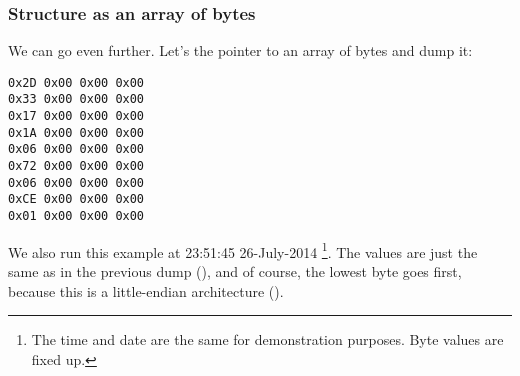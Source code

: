 \subsubsection{Structure as an array of bytes}

We can go even further. Let's  the pointer to an array of bytes and dump it:



\begin{lstlisting}
0x2D 0x00 0x00 0x00 
0x33 0x00 0x00 0x00 
0x17 0x00 0x00 0x00 
0x1A 0x00 0x00 0x00 
0x06 0x00 0x00 0x00 
0x72 0x00 0x00 0x00 
0x06 0x00 0x00 0x00 
0xCE 0x00 0x00 0x00 
0x01 0x00 0x00 0x00 
\end{lstlisting}

We also run this example at 23:51:45 26-July-2014
\footnote{The time and date are the same for demonstration purposes. Byte values are fixed up.}.
The values are just the same as in the previous dump 
(), and of course, the lowest byte goes first, because this is a little-endian architecture 
().


